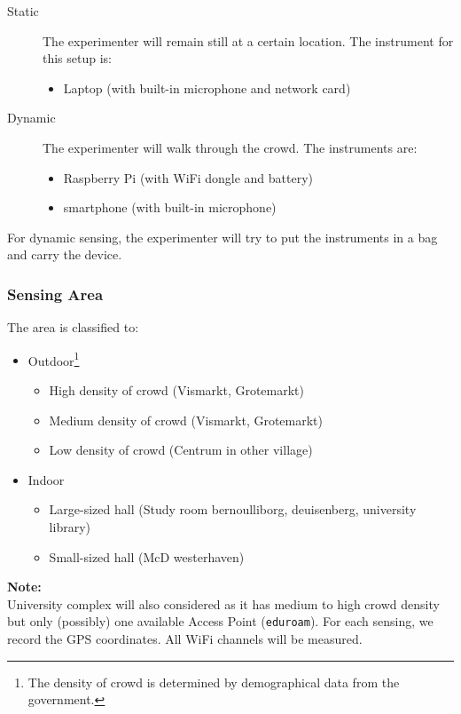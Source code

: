 \documentclass{article}
\begin{document}
\label{ssub:sensing_setup}
\begin{description}
	\item[Static] The experimenter will remain still at a certain location. The instrument for this setup is:
	\begin{itemize}
		\item Laptop (with built-in microphone and network card)
	\end{itemize}

	\item[Dynamic] The experimenter will walk through the crowd. The instruments are:
	\begin{itemize}
		\item Raspberry Pi (with WiFi dongle and battery)
		\item smartphone (with built-in microphone)
	\end{itemize}
\end{description}

For dynamic sensing, the experimenter will try to put the instruments in a bag and carry the device.

\subsubsection*{Sensing Area} %
\label{ssub:sensing_area}
The area is classified to:
\begin{itemize}
	\item Outdoor\footnote{The density of crowd is determined by demographical data from the government.}
	\begin{itemize}
		\item High density of crowd (Vismarkt, Grotemarkt)
		\item Medium density of crowd (Vismarkt, Grotemarkt)
		\item Low density of crowd (Centrum in other village)
	\end{itemize}
	
	\item Indoor
	\begin{itemize}
		\item Large-sized hall (Study room bernoulliborg, deuisenberg, university library)
		\item Small-sized hall (McD westerhaven)
	\end{itemize}
\end{itemize}

\noindent\textbf{Note:}\\
University complex will also considered as it has medium to high crowd density but only (possibly) one available Access Point (\texttt{eduroam}). For each sensing, we record the GPS coordinates. All WiFi channels will be measured.
\end{document}
